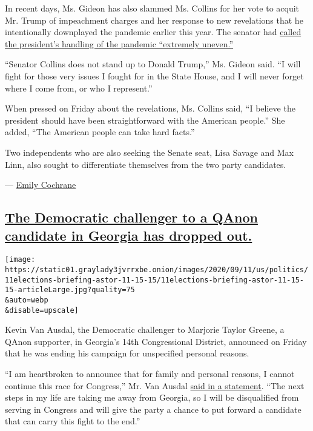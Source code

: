 In recent days, Ms. Gideon has also slammed Ms. Collins for her vote to
acquit Mr. Trump of impeachment charges and her response to new
revelations that he intentionally downplayed the pandemic earlier this
year. The senator had
\href{https://www.mainepublic.org/post/collins-king-respond-trumps-misleading-coronavirus-comments}{called
the president's handling of the pandemic ``extremely uneven.''}

``Senator Collins does not stand up to Donald Trump,'' Ms. Gideon said.
``I will fight for those very issues I fought for in the State House,
and I will never forget where I come from, or who I represent.''

When pressed on Friday about the revelations, Ms. Collins said, ``I
believe the president should have been straightforward with the American
people.'' She added, ``The American people can take hard facts.''

Two independents who are also seeking the Senate seat, Lisa Savage and
Max Linn, also sought to differentiate themselves from the two party
candidates.

--- \href{https://www.nytimes3xbfgragh.onion/by/emily-cochrane}{Emily
Cochrane}

\hypertarget{the-democratic-challenger-to-a-qanon-candidate-in-georgia-has-dropped-out}{%
\subsection{\texorpdfstring{\protect\hyperlink{the-democratic-challenger-to-a-qanon-candidate-in-georgia-has-dropped-out}{The
Democratic challenger to a QAnon candidate in Georgia has dropped
out.}}{The Democratic challenger to a QAnon candidate in Georgia has dropped out.}}\label{the-democratic-challenger-to-a-qanon-candidate-in-georgia-has-dropped-out}}

\texttt{[image: https://static01.graylady3jvrrxbe.onion/images/2020/09/11/us/politics/11elections-briefing-astor-11-15-15/11elections-briefing-astor-11-15-15-articleLarge.jpg?quality=75\\\&auto=webp\\\&disable=upscale]}

Kevin Van Ausdal, the Democratic challenger to Marjorie Taylor Greene, a
QAnon supporter, in Georgia's 14th Congressional District, announced on
Friday that he was ending his campaign for unspecified personal reasons.

``I am heartbroken to announce that for family and personal reasons, I
cannot continue this race for Congress,'' Mr. Van Ausdal
\href{https://twitter.com/KevinVanAusdal/status/1304489108736270337}{said
in a statement}. ``The next steps in my life are taking me away from
Georgia, so I will be disqualified from serving in Congress and will
give the party a chance to put forward a candidate that can carry this
fight to the end.''

